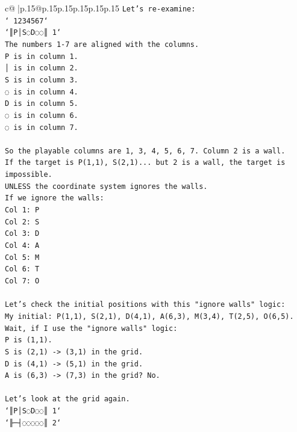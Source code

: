 \documentclass{article}
\begin{document}
{\begin{supertabular}{c@{$\;$}|p{.15\linewidth}@{}p{.15\linewidth}p{.15\linewidth}p{.15\linewidth}p{.15\linewidth}p{.15\linewidth}}
{{{\texttt{Let's re{-}examine:} \\
\texttt{` 1234567`} \\
\texttt{`║P│S◌D◌◌║ 1`} \\
\texttt{The numbers 1{-}7 are aligned with the columns.} \\
\texttt{P is in column 1.} \\
\texttt{│ is in column 2.} \\
\texttt{S is in column 3.} \\
\texttt{◌ is in column 4.} \\
\texttt{D is in column 5.} \\
\texttt{◌ is in column 6.} \\
\texttt{◌ is in column 7.} \\
\\ 
\texttt{So the playable columns are 1, 3, 4, 5, 6, 7. Column 2 is a wall.} \\
\texttt{If the target is P(1,1), S(2,1)... but 2 is a wall, the target is impossible.} \\
\texttt{UNLESS the coordinate system ignores the walls.} \\
\texttt{If we ignore the walls:} \\
\texttt{Col 1: P} \\
\texttt{Col 2: S} \\
\texttt{Col 3: D} \\
\texttt{Col 4: A} \\
\texttt{Col 5: M} \\
\texttt{Col 6: T} \\
\texttt{Col 7: O} \\
\\ 
\texttt{Let's check the initial positions with this "ignore walls" logic:} \\
\texttt{My initial: P(1,1), S(2,1), D(4,1), A(6,3), M(3,4), T(2,5), O(6,5).} \\
\texttt{Wait, if I use the "ignore walls" logic:} \\
\texttt{P is (1,1).} \\
\texttt{S is (2,1) {-}> (3,1) in the grid.} \\
\texttt{D is (4,1) {-}> (5,1) in the grid.} \\
\texttt{A is (6,3) {-}> (7,3) in the grid? No.} \\
\\ 
\texttt{Let's look at the grid again.} \\
\texttt{`║P│S◌D◌◌║ 1`} \\
\texttt{`╟─┤◌◌◌◌◌║ 2`} \\
}}}
\end{supertabular}}
\end{document}
